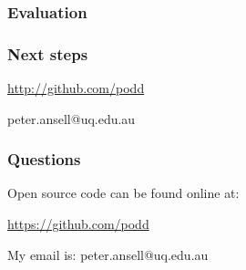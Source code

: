 \documentclass[12pt]{beamer}
\begin{document}
\begin{frame}
\frametitle{Evaluation}

\end{frame}

\begin{frame}
\frametitle{Next steps}

\end{frame}


\begin{frame}

\url{http://github.com/podd}

peter.ansell@uq.edu.au

\end{frame}






\begin{frame}
\frametitle{Questions}

Open source code can be found online at:

\url{https://github.com/podd}

My email is: peter.ansell@uq.edu.au

\end{frame}
\end{document}
